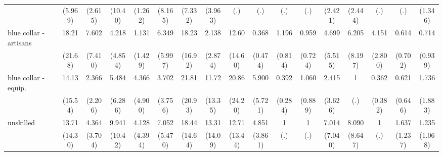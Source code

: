 {\begin{tabular}{l*{16}{c}}
                    &     (5.969)         &     (2.615)         &     (10.40)         &     (1.262)         &     (8.165)         &     (7.332)         &     (3.963)         &         (.)         &         (.)         &         (.)         &         (.)         &     (2.421)         &     (2.444)         &         (.)         &         (.)         &     (1.346)         \\
[1em]
blue collar - artisans&       18.21\sym{*}  &       7.602\sym{*}  &       4.218         &       1.131         &       6.349         &       18.23\sym{**} &       2.138         &       12.60\sym{*}  &       0.368         &       1.196         &       0.959         &       4.699         &       6.205         &       4.151\sym{*}  &       0.614         &       0.714         \\
                    &     (21.68)         &     (7.410)         &     (4.854)         &     (1.429)         &     (5.997)         &     (16.92)         &     (2.874)         &     (14.60)         &     (0.474)         &     (0.814)         &     (0.724)         &     (5.515)         &     (8.197)         &     (2.800)         &     (0.702)         &     (0.939)         \\
[1em]
blue collar - equip.&       14.13\sym{*}  &       2.366         &       5.484         &       4.366         &       3.702         &       21.81\sym{**} &       11.72\sym{*}  &       20.86\sym{**} &       5.900         &       0.392         &       1.060         &       2.415         &           1         &       0.362         &       0.621         &       1.736         \\
                    &     (15.54)         &     (2.206)         &     (6.286)         &     (4.900)         &     (3.756)         &     (20.93)         &     (13.35)         &     (24.20)         &     (5.721)         &     (0.284)         &     (0.889)         &     (3.626)         &         (.)         &     (0.382)         &     (0.646)         &     (1.883)         \\
[1em]
unskilled           &       13.71\sym{*}  &       4.364         &       9.941\sym{*}  &       4.128         &       7.052\sym{*}  &       18.44\sym{***}&       13.31\sym{*}  &       12.71\sym{*}  &       4.851\sym{*}  &           1         &           1         &       7.014         &       8.090         &           1         &       1.637         &       1.235         \\
                    &     (14.30)         &     (3.704)         &     (10.42)         &     (4.394)         &     (5.470)         &     (14.64)         &     (14.09)         &     (13.44)         &     (3.861)         &         (.)         &         (.)         &     (7.040)         &     (8.647)         &         (.)         &     (1.237)         &     (1.068)         \\

\end{tabular}}
